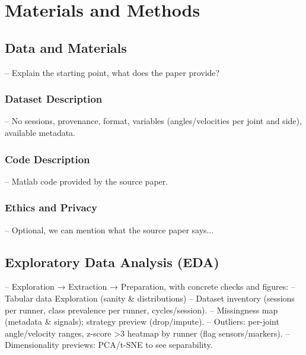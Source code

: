 \chapter{Materials and Methods}\label{chap:materials-methods}

\section{Data and Materials}\label{sec:method-data-materials}
-- Explain the starting point, what does the paper provide?

\subsection{Dataset Description}\label{subsec:method-dataset-description}
-- No sessions, provenance, format, variables (angles/velocities per joint and side), available metadata.

\subsection{Code Description}\label{subsec:method-code-description}
-- Matlab code provided by the source paper.



\subsection{Ethics and Privacy}\label{subsec:method-ethics}
-- Optional, we can mention what the source paper says...

\section{Exploratory Data Analysis (EDA)}\label{sec:method-eda}
-- Exploration → Extraction → Preparation, with concrete checks and figures:
-- Tabular data Exploration (sanity \& distributions)
-- Dataset inventory (sessions per runner, class prevalence per runner, cycles/session).
-- Missingness map (metadata \& signals); strategy preview (drop/impute).
-- Outliers: per-joint angle/velocity ranges, z-score >3 heatmap by runner (flag sensors/markers).
-- Dimensionality previews: PCA/t-SNE to see separability.



